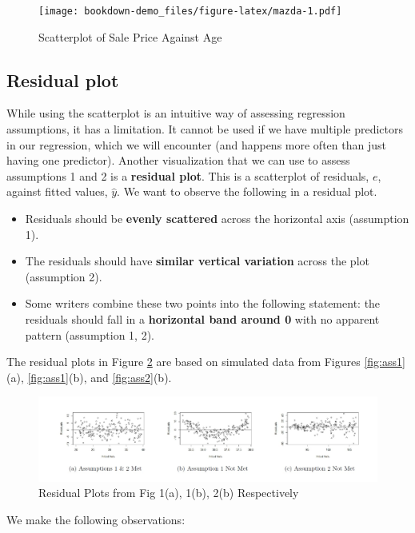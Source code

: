 \documentclass[
]{book}
\providecommand{\tightlist}{%
  \setlength{\itemsep}{0pt}\setlength{\parskip}{0pt}}
\begin{document}
\begin{figure}
\centering
\texttt{[image: bookdown-demo\_files/figure-latex/mazda-1.pdf]}
\caption{\label{fig:mazda}Scatterplot of Sale Price Against Age}
\end{figure}

\hypertarget{residual-plot}{%
\subsection{Residual plot}\label{residual-plot}}

While using the scatterplot is an intuitive way of assessing regression assumptions, it has a limitation. It cannot be used if we have multiple predictors in our regression, which we will encounter (and happens more often than just having one predictor). Another visualization that we can use to assess assumptions 1 and 2 is a \textbf{residual plot}. This is a scatterplot of residuals, \(e\), against fitted values, \(\hat{y}\). We want to observe the following in a residual plot.

\begin{itemize}
\tightlist
\item
  Residuals should be \textbf{evenly scattered} across the horizontal axis (assumption 1).
\item
  The residuals should have \textbf{similar vertical variation} across the plot (assumption 2).
\item
  Some writers combine these two points into the following statement: the residuals should fall in a \textbf{horizontal band around 0} with no apparent pattern (assumption 1, 2).
\end{itemize}

The residual plots in Figure \ref{fig:resplots} are based on simulated data from Figures \ref{fig:ass1}(a), \ref{fig:ass1}(b), and \ref{fig:ass2}(b).

\begin{figure}
\centering
\includegraphics{images/resplots.jpg}
\caption{\label{fig:resplots}Residual Plots from Fig 1(a), 1(b), 2(b) Respectively}
\end{figure}

We make the following observations:
\end{document}
